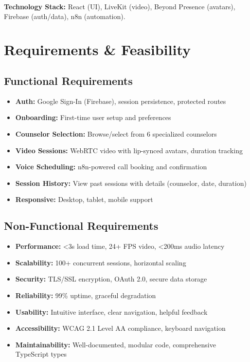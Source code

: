 \documentclass[11pt,a4paper]{report}
\begin{document}
\textbf{Technology Stack:} React (UI), LiveKit (video), Beyond Presence (avatars), Firebase (auth/data), n8n (automation).

\section{Requirements \& Feasibility}

\subsection{Functional Requirements}
\begin{itemize}
    \item \textbf{Auth:} Google Sign-In (Firebase), session persistence, protected routes
    \item \textbf{Onboarding:} First-time user setup and preferences
    \item \textbf{Counselor Selection:} Browse/select from 6 specialized counselors
    \item \textbf{Video Sessions:} WebRTC video with lip-synced avatars, duration tracking
    \item \textbf{Voice Scheduling:} n8n-powered call booking and confirmation
    \item \textbf{Session History:} View past sessions with details (counselor, date, duration)
    \item \textbf{Responsive:} Desktop, tablet, mobile support
\end{itemize}

\subsection{Non-Functional Requirements}
\begin{itemize}
    \item \textbf{Performance:} <3s load time, 24+ FPS video, <200ms audio latency
    \item \textbf{Scalability:} 100+ concurrent sessions, horizontal scaling
    \item \textbf{Security:} TLS/SSL encryption, OAuth 2.0, secure data storage
    \item \textbf{Reliability:} 99\% uptime, graceful degradation
    \item \textbf{Usability:} Intuitive interface, clear navigation, helpful feedback
    \item \textbf{Accessibility:} WCAG 2.1 Level AA compliance, keyboard navigation
    \item \textbf{Maintainability:} Well-documented, modular code, comprehensive TypeScript types
\end{itemize}
\end{document}
